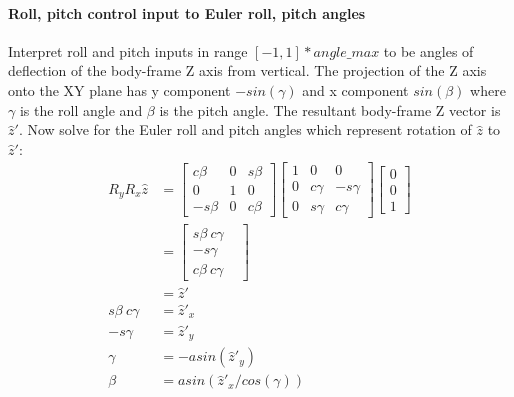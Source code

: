 \documentclass{article}
\begin{document}
    \paragraph*{Roll, pitch control input to Euler roll, pitch angles}
    Interpret roll and pitch inputs in range $[-1,1]*angle\_max$ to be angles of deflection of the body-frame Z axis from vertical.
    The projection of the Z axis onto the XY plane has y component $-sin(\gamma)$ and x component $sin(\beta)$ where
    $\gamma$ is the roll angle and $\beta$ is the pitch angle.
    The resultant body-frame Z vector is $\widehat{z}'$.  Now solve for the Euler roll and pitch angles which represent rotation of $\widehat{z}$ to $\widehat{z}'$:
    \[
    \begin{aligned}
        R_{y}R_{x}\widehat{z}&=
        \begin{bmatrix}
        c\beta  & 0 & s\beta  \\
        0 & 1 & 0 \\
        -s\beta  & 0 & c\beta 
        \end{bmatrix}
        \begin{bmatrix}
        1 & 0 & 0 \\
        0 & c\gamma & -s\gamma  \\
        0 & s\gamma & c\gamma 
        \end{bmatrix}
        \begin{bmatrix}
        0 \\
        0 \\
        1
        \end{bmatrix}\\
        &=
        \begin{bmatrix}
        s\beta \ c\gamma  \\
        -s\gamma  &  \\
        c\beta \ c\gamma 
        \end{bmatrix} \\
        &= \widehat{z}' \\
        s\beta \ c\gamma &= \widehat{z}'_x  \\
        -s\gamma &= \widehat{z}'_y \\
        \gamma &= -asin(\widehat{z}'_y) \\
        \beta &= asin(\widehat{z}'_x / cos(\gamma))
    \end{aligned}
    \]
\end{document}
